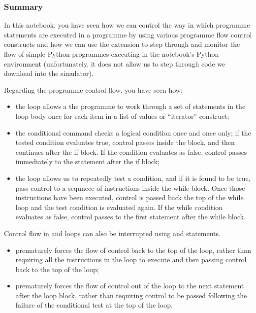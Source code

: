 \documentclass[letterpaper,10pt,english]{sphinxmanual}
\begin{document}
\subsubsection{Summary}
\label{\detokenize{content/02_Robot_Lab/Section_00_01:Summary}}
In this notebook, you have seen how we can control the way in which programme statements are executed in a programme by using various programme flow control constructs and how we can use the  extension to step through and monitor the flow of simple Python programmes executing in the notebook’s Python environment (unfortunately, it does not allow us to step through code we download into the simulator).

Regarding the programme control flow, you have seen how:
\begin{itemize}
\item {} 
the  loop allows a the programme to work through a set of statements in the loop body once for each item in a list of values or “iterator” construct;

\item {} 
the  conditional command checks a logical condition once and once only; if the tested condition evaluates true, control passes inside the block, and then continues after the if block. If the condition evaluates as false, control passes immediately to the statement after the if block;

\item {} 
the  loop allows us to repeatedly test a condition, and if it is found to be true, pass control to a sequnece of instructions inside the while block. Once those instructions have been executed, control is passed back the top of the while loop and the test condition is evaluated again. If the while condition evaluates as false, control passes to the first statement after the while block.

\end{itemize}

Control flow in  and  loops can also be interrupted using  and  statements.
\begin{itemize}
\item {} 
 prematurely forces the flow of control back to the top of the loop, rather than requiring all the instructions in the loop to execute and then passing control back to the top of the loop;

\item {} 
 prematurely forces the flow of control out of the loop to the next statement after the loop block, rather than requiring control to be passed following the failure of the conditional test at the top of the loop.

\end{itemize}
\end{document}
